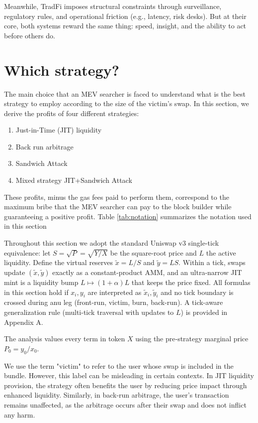 \documentclass[a4paper,11pt]{article}
\begin{document}
Meanwhile, TradFi imposes structural constraints through surveillance, regulatory rules, and operational friction (e.g., latency, risk desks). But at their core, both systems reward the same thing: speed, insight, and the ability to act before others do. 

\section{Which strategy?}
The main choice that an MEV searcher is faced to understand what is the best strategy to employ according to the size of the victim's swap. In this section, we derive the profits of four different strategies:
\begin{enumerate}
    \item Just-in-Time (JIT) liquidity
    \item Back run arbitrage
    \item Sandwich Attack
    \item Mixed strategy JIT+Sandwich Attack
\end{enumerate}
These profits, minus the gas fees paid to perform them, correspond to the maximum bribe that the MEV searcher can pay to the block builder while guaranteeing a positive profit.
Table \ref{tab:notation} summarizes the notation used in this section

Throughout this section we adopt the standard Uniswap v3 single-tick equivalence: let $S=\sqrt{P}=\sqrt{Y/X}$ be the square-root price and $L$ the active liquidity. Define the virtual reserves $\tilde{x}=L/S$  and $\tilde{y}=LS$. Within a tick, swaps update $(\tilde{x},\tilde{y})$ exactly as a constant-product AMM, and an ultra-narrow JIT mint is a liquidity bump $L\mapsto(1+\alpha)L$ that keeps the price fixed. All formulas in this section hold if  $x_i,y_i$ are interpreted as $\tilde{x}_i,\tilde{y}_i$ and no tick boundary is crossed during anu leg (front-run, victim, burn, back-run). A tick-aware generalization rule (multi-tick traversal with updates to $L$) is provided in Appendix A.

The analysis values every term in token $X$ using the pre‑strategy marginal price $P_0 = y_0/x_0$.

We use the term "victim" to refer to the user whose swap is included in the bundle. However, this label can be misleading in certain contexts. In JIT liquidity provision, the strategy often benefits the user by reducing price impact through enhanced liquidity. Similarly, in back-run arbitrage, the user's transaction remains unaffected, as the arbitrage occurs after their swap and does not inflict any harm.
\end{document}
